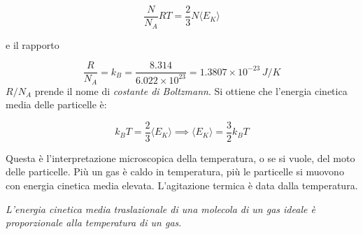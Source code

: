 \[
	\frac{N}{N_A } RT = \frac{2}{3} N \langle E_K \rangle
\]

e il rapporto

\[
	\frac{R}{N_A } = k_B = \frac{8.314}{6.022 \times 10^{23} } = 1.3807 \times 10^{-23}\,J/K
\]
$R/N_A$ prende il nome di \emph{costante di Boltzmann}. Si ottiene che l'energia cinetica media delle particelle è:

\[
	k_B T = \frac{2}{3} \langle E_K \rangle \implies \boxed{\langle E_K \rangle = \frac{3}{2} k_B T}
\]

Questa è l'interpretazione microscopica della temperatura, o se si vuole, del moto delle particelle. Più un gas è caldo in temperatura, più le particelle si muovono con energia cinetica media elevata. L'agitazione termica è data dalla temperatura.

\emph{L'energia cinetica media traslazionale di una molecola di un gas ideale è proporzionale alla temperatura di un gas}.
